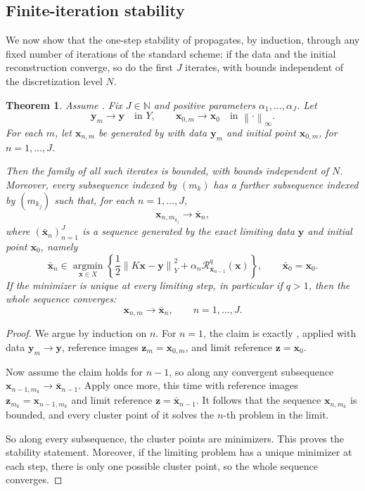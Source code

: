 \documentclass{article}
\newtheorem{theorem}{Theorem}[section]
\theoremstyle{remark}
\newcommand{\N}{\mathbb{N}}
\newcommand{\norm}[1]{\left\lVert #1 \right\rVert}
\newcommand{\Rreg}{\mathcal{R}}
\newcommand{\bx}{{\bm{x}}}
\newcommand{\by}{{\bm{y}}}
\newcommand{\bz}{{\bm{z}}}
\begin{document}
\subsection{Finite-iteration stability}
We now show that the one-step stability of 
propagates, by induction, through any fixed number of iterations of the standard
scheme: if the data and the initial reconstruction
converge, so do the first $J$ iterates, with bounds independent of the
discretization level $N$. 
\begin{theorem}\label{thm:finite-stability}
Assume . Fix $J\in\N$ and positive parameters $\alpha_1,\ldots,\alpha_J$. Let
\[
\by_m\to \by \quad\text{in }Y,
\qquad
\bx_{0,m}\to \bx_0 \quad\text{in }\norm{\cdot}_\infty.
\]
For each $m$, let $\bx_{n,m}$ be generated by  with data $\by_m$ and initial point $\bx_{0,m}$, for $n=1,\ldots,J$.

Then the family of all such iterates is bounded, with bounds independent of $N$. Moreover, every subsequence indexed by $(m_k)$ has a further subsequence indexed by $(m_{k_j})$ such that, for each $n=1,\ldots,J$,
\[
\bx_{n,m_{k_j}}\to \bar \bx_n,
\]
where $(\bar \bx_n)_{n=1}^J$ is a sequence generated by the exact limiting data $\by$ and initial point $\bx_0$, namely
\[
\bar \bx_n\in\operatorname*{argmin}_{\bx\in X}
\left\{
\frac12\norm{K\bx-\by}_Y^2
+\alpha_n\Rreg_{\bar \bx_{n-1}}^q(\bx)
\right\},
\qquad \bar \bx_0=\bx_0.
\]
If the minimizer is unique at every limiting step, in particular if $q>1$, then the whole sequence converges:
\[
\bx_{n,m}\to \bar \bx_n,
\qquad n=1,\ldots,J.
\]
\end{theorem}

\begin{proof}
We argue by induction on $n$. For $n=1$, the claim is exactly , applied with data $\by_m\to\by$, reference images $\bz_m=\bx_{0,m}$, and limit reference $\bz=\bx_0$.

Now assume the claim holds for $n-1$, so along any convergent subsequence $\bx_{n-1,m_k}\to\bar\bx_{n-1}$. Apply  once more, this time with reference images $\bz_{m_k}=\bx_{n-1,m_k}$ and limit reference $\bz=\bar\bx_{n-1}$. It follows that the sequence $\bx_{n,m_k}$ is bounded, and every cluster point of it solves the $n$-th problem in the limit.

So along every subsequence, the cluster points are minimizers. This proves the stability statement. Moreover, if the limiting problem has a unique minimizer at each step, there is only one possible cluster point, so the whole sequence converges.
\end{proof}
\end{document}
